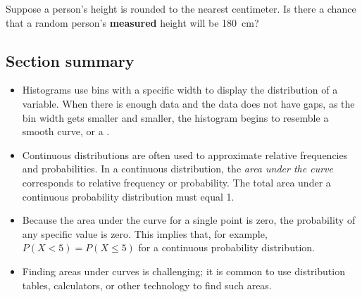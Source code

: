 \begin{exercisewrap}
\begin{nexercise}
Suppose a person's height is rounded to the nearest centimeter. Is there a chance that a random person's \textbf{measured} height will be 180~cm?\footnotemark
\end{nexercise}
\end{exercisewrap}



\D{\newpage}

\subsection*{Section summary}
\begin{itemize}
\item Histograms use bins with a specific width to display the distribution of a variable.  When there is enough data and the data does not have gaps, as the bin width gets smaller and smaller, the histogram begins to resemble a smooth curve, or a . 

\item Continuous distributions are often used to approximate relative frequencies and probabilities.  In a continuous distribution, the \emph{area under the curve} corresponds to relative frequency or probability.  The total area under a continuous probability distribution must equal 1.  

\item Because the area under the curve for a single point is zero, the probability of any specific value is zero.  This implies that, for example, $P(X < 5) = P(X \le 5)$ for a continuous probability distribution.

\item Finding areas under curves is challenging; it is common to use distribution tables, calculators, or other technology to find such areas.

\end{itemize}






\D{\newpage}

